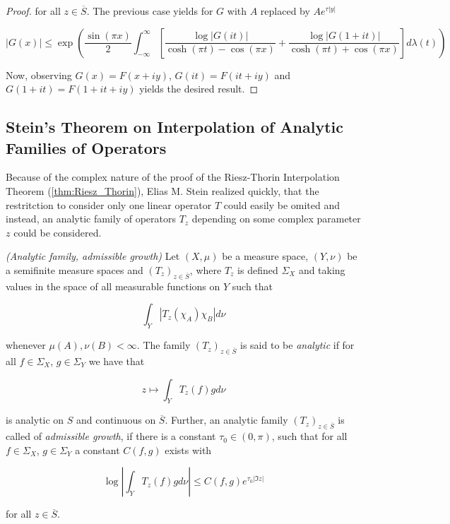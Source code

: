 \begin{proof}
		for all $z \in \overline{S}$. The previous case yields for $G$ with $A$ replaced by $Ae^{\tau\vert y \vert}$

		\begin{equation}
			\vert G(x) \vert \leqslant \exp\left( \frac{\sin(\pi x)}{2} \int_{-\infty}^\infty \left[ \frac{\log \vert G(it)\vert}{\cosh(\pi t) - \cos(\pi x)} + \frac{\log \vert G(1 + it)\vert}{\cosh(\pi t) + \cos(\pi x)} \right] d\lambda(t)\right)
		\end{equation}

		Now, observing $G(x) = F(x + iy)$, $G(it) = F(it + iy)$ and $G(1 + it) = F(1 + it + iy)$ yields the desired result.
\end{proof}

\subsection{Stein's Theorem on Interpolation of Analytic Families of Operators}
Because of the complex nature of the proof of the Riesz-Thorin Interpolation Theorem (\ref{thm:Riesz_Thorin}), Elias M. Stein realized quickly, that the restritction to consider only one linear operator $T$ could easily be omited and instead, an analytic family of operators $T_z$ depending on some complex parameter $z$ could be considered.

\vspace{2mm}

\begin{mdframed}
	\begin{definition}\emph{(Analytic family, admissible growth)}
		Let $(X,\mu)$ be a measure space, $(Y,\nu)$ be a semifinite measure spaces and $\left( T_z \right)_{z \in \overline{S}}$, where $T_z$ is defined $\Sigma_X$ and taking values in the space of all measurable functions on $Y$ such that

		\begin{equation}
			\int_Y \left| T_z(\chi_A)\chi_B \right| d\nu
		\end{equation}

		whenever $\mu(A),\nu(B) < \infty$. The family $\left( T_z \right)_{z \in \overline{S}}$ is said to be \emph{analytic} if for all $f \in \Sigma_X$, $g \in \Sigma_Y$ we have that

		\begin{equation}
			z \mapsto \int_Y T_z(f)gd\nu
		\end{equation}

		is analytic on $S$ and continuous on $\overline{S}$. Further, an analytic family $\left( T_z \right)_{z \in \overline{S}}$ is called of \emph{admissible growth}, if there is a constant $\tau_0 \in (0,\pi)$, such that for all $f \in \Sigma_X$, $g \in \Sigma_Y$ a constant $C(f,g)$ exists with

			\begin{equation}
				\log\left| \int_Y T_z(f) g d\nu\right| \leqslant C(f,g)e^{\tau_0\left| \Im z\right|}
			\end{equation}

			for all $z \in \overline{S}$.
	\end{definition}
\end{mdframed}

